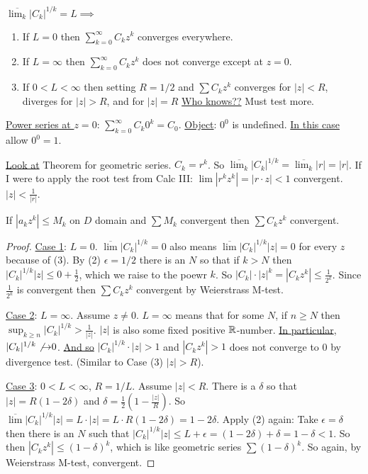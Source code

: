 \documentclass[]{article}
\begin{document}
\newpage

\begin{theorem}
	$\displaystyle \overline{\lim_k} |C_k|^{1/k} = L \implies$
	\begin{enumerate}
		\item If $L=0$ then $\sum_{k=0}^\infty C_k z^k$ converges everywhere.
		\item If $L=\infty$ then $\sum_{k=0}^\infty C_kz^k$ does not converge except at $z=0$.
		\item If $0<L<\infty$ then setting $R=1/2$ and $\sum C_kz^k$ converges for $|z|<R$, diverges for $|z|>R$, and for $|z|=R$ \underline{Who knows??} Must test more.
	\end{enumerate}
\end{theorem}

\underline{Power series at $z=0$}: $\sum_{k=0}^\infty C_k 0^k = C_0$. \underline{Object}: $0^0$ is undefined. \underline{In this case} allow $0^0=1$.

\underline{Look at} Theorem for geometric series. $C_k=r^k$. So $\overline{\lim_k} |C_k|^{1/k} = \overline{\lim_k} |r| = |r|$. If I were to apply the root test from Calc III: $\lim|r^kz^k| = |r\cdot z| < 1$ convergent. $|z|<\frac{1}{|r|}$.

\begin{theorem}
	 If $|a_k z^k| \leq M_k$ on $D$ domain and $\sum M_k$ convergent then $\sum C_k z^k$ convergent.
\end{theorem}

\begin{proof}
	\underline{Case 1}: $L=0$. $\overline{\lim}|C_k|^{1/k} = 0$ also means $\overline{\lim}|C_k|^{1/k} |z| = 0$ for every $z$ because of (3). By (2) $\epsilon = 1/2$ there is an $N$ so that if $k>N$ then $|C_k|^{1/k}|z|\leq 0+\frac{1}{2}$, which we raise to the poewr $k$. So $|C_k|\cdot|z|^k = |C_k z^k| \leq \frac{1}{2^k}$. Since $\frac{1}{2^k}$ is convergent then $\sum C_k z^k$ convergent by Weierstrass M-test.
	
	\underline{Case 2}: $L=\infty$. Assume $z\neq 0$. $L = \infty$ means that for some $N$, if $n\geq N$ then $\sup_{k\geq n} |C_k|^{1/k} > \frac{1}{|z|}$. $|z|$ is also some fixed positive $\mathbb{R}$-number. \underline{In particular}, $|C_k|^{1/k} \not{\rightarrow} 0$. \underline{And so} $|C_k|^{1/k} \cdot |z| >1$ and $|C_k z^k|>1$ does not converge to 0 by divergence test. (Similar to Case (3) $|z|> R$).
	
	\underline{Case 3}: $0<L<\infty$, $R=1/L$. Assume $|z|<R$. There is a $\delta$ so that $|z| = R(1-2\delta)$ and $\delta=\frac{1}{2}(1-\frac{|z|}{R})$. So $\overline{\lim}|C_k|^{1/k} |z| = L\cdot |z| = L\cdot R(1-2\delta) = 1-2\delta$. Apply (2) again: Take $\epsilon=\delta$ then there is an $N$ such that $|C_k|^{1/k} |z| \leq L+\epsilon = (1-2\delta) + \delta = 1-\delta < 1$. So then $|C_k z^k| \leq (1-\delta)^k$, which is like geometric series $\sum(1-\delta)^k$. So again, by Weierstrass M-test, convergent.
\end{proof}
\end{document}
